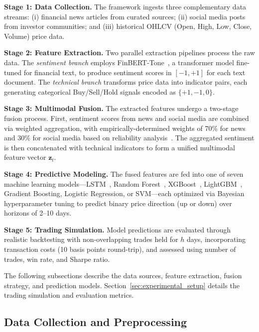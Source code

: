 \documentclass[a4paper,10pt,conference]{IEEEtran}
\begin{document}
\textbf{Stage 1: Data Collection.} The framework ingests three complementary data streams: (i) financial news articles from curated sources;
(ii) social media posts from investor communities; %
and (iii) historical OHLCV (Open, High, Low, Close, Volume) price data.%

\textbf{Stage 2: Feature Extraction.} Two parallel extraction pipelines process the raw data. The \textit{sentiment branch} employs FinBERT-Tone~\cite{huang2022}, a transformer model fine-tuned for financial text, to produce sentiment scores in $[-1, +1]$ for each text document. 
The \textit{technical branch} transforms price data into indicator pairs, each generating categorical Buy/Sell/Hold signals encoded as $\{+1, -1, 0\}$.

\textbf{Stage 3: Multimodal Fusion.} The extracted features undergo a two-stage fusion process. First, sentiment scores from news and social media are combined via weighted aggregation, with empirically-determined weights of 70\% for news and 30\% for social media based on reliability analysis~\cite{nyakurukwa2024}. The aggregated sentiment is then concatenated with technical indicators to form a unified multimodal feature vector $\mathbf{z}_t$.

\textbf{Stage 4: Predictive Modeling.} The fused features are fed into one of seven machine learning models---LSTM~\cite{hochreiter1997}, Random Forest~\cite{breiman2001}, XGBoost~\cite{chen2016xgboost}, LightGBM~\cite{ke2017lightgbm}, Gradient Boosting, Logistic Regression, or SVM---each optimized via Bayesian hyperparameter tuning to predict binary price direction (up or down) over horizons of 2--10 days.

\textbf{Stage 5: Trading Simulation.} Model predictions are evaluated through realistic backtesting with non-overlapping trades held for $h$ days, incorporating transaction costs (10 basis points round-trip), and assessed using number of trades, win rate, and Sharpe ratio.

The following subsections describe the data sources, feature extraction, fusion strategy, and prediction models. Section~\ref{sec:experimental_setup} details the trading simulation and evaluation metrics.

\subsection{Data Collection and Preprocessing}
\end{document}
